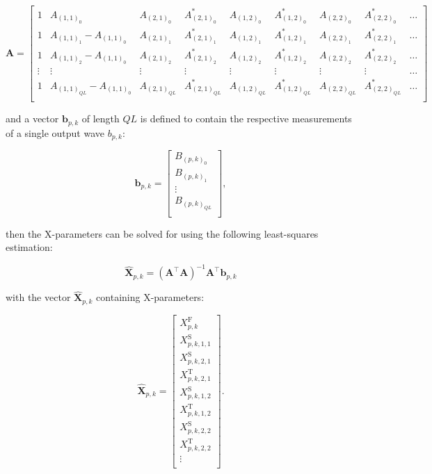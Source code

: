\documentclass[../thesis/thesis.tex]{subfiles}
\begin{document}
\begin{equation}
	\bm{A} =
	\begin{bmatrix}
		1 & A_{(1,1)_0} & A_{(2,1)_0} & A^*_{(2,1)_0} & A_{(1,2)_0} & A^*_{(1,2)_0} & A_{(2,2)_0} & A^*_{(2,2)_0} & \dots \\
		1 & A_{(1,1)_1} - A_{(1,1)_0} & A_{(2,1)_1} & A^*_{(2,1)_1} & A_{(1,2)_1} & A^*_{(1,2)_1} & A_{(2,2)_1} & A^*_{(2,2)_1} & \dots \\
		1 & A_{(1,1)_2} - A_{(1,1)_0} & A_{(2,1)_2} & A^*_{(2,1)_2} & A_{(1,2)_2} & A^*_{(1,2)_2} & A_{(2,2)_2} & A^*_{(2,2)_2} & \dots \\
		\vdots & \vdots & \vdots & \vdots & \vdots & \vdots & \vdots & \vdots & \dots \\
		1 & A_{(1,1)_{QL}} - A_{(1,1)_0} & A_{(2,1)_{QL}} & A^*_{(2,1)_{QL}} & A_{(1,2)_{QL}} & A^*_{(1,2)_{QL}} & A_{(2,2)_{QL}} & A^*_{(2,2)_{QL}} & \dots \\
	\end{bmatrix}
\end{equation}

and a vector $\bm{b}_{p,k}$ of length $QL$ is defined to contain the respective measurements of a single output wave $b_{p,k}$:

\begin{equation}
	\bm{b}_{p,k} =
	\begin{bmatrix}
		B_{(p,k)_0} \\
		B_{(p,k)_1} \\
		\vdots \\
		B_{(p,k)_{QL}} \\
	\end{bmatrix},
\end{equation}

then the X-parameters can be solved for using the following least-squares estimation:

\begin{equation}
	\bm{\hat{X}}_{p,k} = (\bm{A}^\top \bm{A})^{-1}\bm{A}^\top \bm{b}_{p,k}
\end{equation}

with the vector $\bm{\hat{X}}_{p,k}$ containing X-parameters:

\begin{equation}
	\bm{\hat{X}}_{p,k} = 
	\begin{bmatrix}
		X^\textrm{F}_{p,k} \\
		X^\textrm{S}_{p,k, 1, 1} \\
		X^\textrm{S}_{p,k, 2, 1} \\
		X^\textrm{T}_{p,k, 2, 1} \\
		X^\textrm{S}_{p,k, 1, 2} \\
		X^\textrm{T}_{p,k, 1, 2} \\
		X^\textrm{S}_{p,k, 2, 2} \\
		X^\textrm{T}_{p,k, 2, 2} \\
		\vdots \\
	\end{bmatrix}.
\end{equation}
\end{document}
